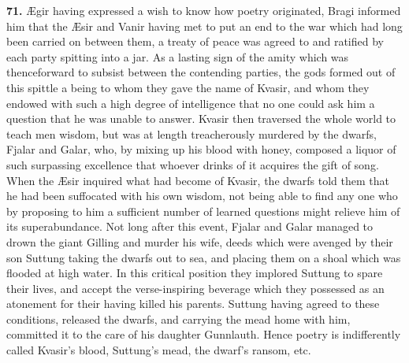 
\textbf{71.} Ægir having expressed a wish to know how poetry originated,
Bragi informed him that the Æsir and Vanir having met to put an end to
the war which had long been carried on between them, a treaty of
peace was agreed to and ratified by each party spitting into a jar. As
a lasting sign of the amity which was thenceforward to subsist between
the contending parties, the gods formed out of this spittle a being to
whom they gave the name of Kvasir, and whom they endowed with such a
high degree of intelligence that no one could ask him a question that
he was unable to answer. Kvasir then traversed the whole world to
teach men wisdom, but was at length treacherously murdered by the
dwarfs, Fjalar and Galar, who, by mixing up his blood with honey,
composed a liquor of such surpassing excellence that whoever drinks of
it acquires the gift of song. When the Æsir inquired what had become
of Kvasir, the dwarfs told them that he had been suffocated with his
own wisdom, not being able to find any one who by proposing to him a
sufficient number of learned questions might relieve him of its
superabundance. Not long after this event, Fjalar and Galar managed to
drown the giant Gilling and murder his wife, deeds which were avenged
by their son Suttung taking the dwarfs out to sea, and placing them on
a shoal which was flooded at high water. In this critical position
they implored Suttung to spare their lives, and accept the
verse-inspiring beverage which they possessed as an atonement for
their having killed his parents. Suttung having agreed to these
conditions, released the dwarfs, and carrying the mead home with him,
committed it to the care of his daughter Gunnlauth. Hence poetry is
indifferently called Kvasir's blood, Suttung's mead, the dwarf's
ransom, etc.


